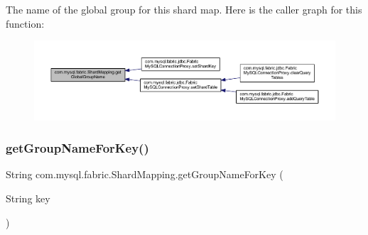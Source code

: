 The name of the global group for this shard map. Here is the caller graph for this function\+:\nopagebreak
\begin{figure}[H]
\begin{center}
\leavevmode
\includegraphics[width=350pt]{classcom_1_1mysql_1_1fabric_1_1_shard_mapping_a87e18cf8f09fdab3db0cf08d239fabd8_icgraph}
\end{center}
\end{figure}
\mbox{\label{classcom_1_1mysql_1_1fabric_1_1_shard_mapping_a614f8944251516b5f55e0a20e710ccba}} 
\subsubsection{\texorpdfstring{get\+Group\+Name\+For\+Key()}{getGroupNameForKey()}}
{\footnotesize\ttfamily String com.\+mysql.\+fabric.\+Shard\+Mapping.\+get\+Group\+Name\+For\+Key (\begin{DoxyParamCaption}\item[{String}]{key }\end{DoxyParamCaption})}

